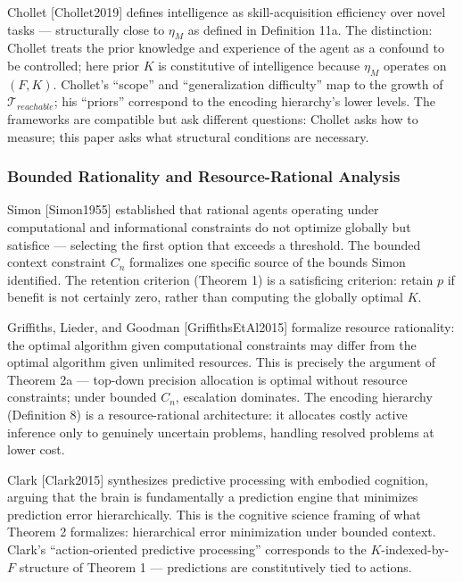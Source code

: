 \documentclass[
]{article}
\begin{document}
Chollet {[}Chollet2019{]} defines intelligence as skill-acquisition
efficiency over novel tasks --- structurally close to \(\eta_M\) as
defined in Definition 11a. The distinction: Chollet treats the prior
knowledge and experience of the agent as a confound to be controlled;
here prior \(K\) is constitutive of intelligence because \(\eta_M\)
operates on \((F, K)\). Chollet's ``scope'' and ``generalization
difficulty'' map to the growth of \(\mathcal{T}_{reachable}\); his
``priors'' correspond to the encoding hierarchy's lower levels. The
frameworks are compatible but ask different questions: Chollet asks how
to measure; this paper asks what structural conditions are necessary.

\subsubsection{Bounded Rationality and Resource-Rational
Analysis}\label{bounded-rationality}

Simon {[}Simon1955{]} established that rational agents operating under
computational and informational constraints do not optimize globally but
satisfice --- selecting the first option that exceeds a threshold. The
bounded context constraint \(C_n\) formalizes one specific source of the
bounds Simon identified. The retention criterion (Theorem 1) is a
satisficing criterion: retain \(p\) if benefit is not certainly zero,
rather than computing the globally optimal \(K\).

Griffiths, Lieder, and Goodman {[}GriffithsEtAl2015{]} formalize
resource rationality: the optimal algorithm given computational
constraints may differ from the optimal algorithm given unlimited
resources. This is precisely the argument of Theorem 2a --- top-down
precision allocation is optimal without resource constraints; under
bounded \(C_n\), escalation dominates. The encoding hierarchy
(Definition 8) is a resource-rational architecture: it allocates costly
active inference only to genuinely uncertain problems, handling resolved
problems at lower cost.

Clark {[}Clark2015{]} synthesizes predictive processing with embodied
cognition, arguing that the brain is fundamentally a prediction engine
that minimizes prediction error hierarchically. This is the cognitive
science framing of what Theorem 2 formalizes: hierarchical error
minimization under bounded context. Clark's ``action-oriented predictive
processing'' corresponds to the \(K\)-indexed-by-\(F\) structure of
Theorem 1 --- predictions are constitutively tied to actions.
\end{document}
